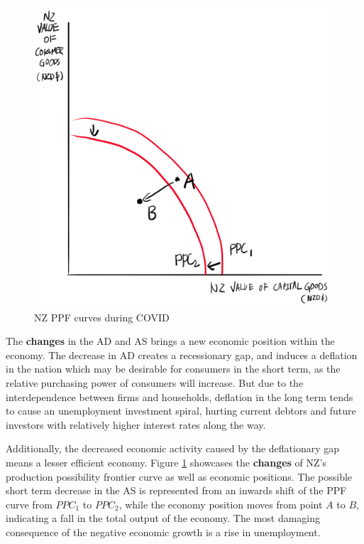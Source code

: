 \documentclass[a4paper,12pt]{article}
\begin{document}
\begin{figure}[H]
    \centering
    \includegraphics[scale=0.6]{assets/ppf.png}
    \caption{NZ PPF curves during COVID}
    \label{fig:ppf}
\end{figure}

The \textbf{changes} in the AD and AS brings a new economic position within the economy. The decrease in AD creates a recessionary gap, and induces a deflation in the nation which may be desirable for consumers in the short term, as the relative purchasing power of consumers will increase. But due to the interdependence between firms and households, deflation in the long term tends to cause an unemployment investment spiral,
hurting current debtors and future investors with relatively higher interest rates along the way.

Additionally, the decreased economic activity caused by the deflationary gap means a lesser efficient economy. Figure \ref{fig:ppf} showcases the \textbf{changes} of NZ's production possibility frontier curve as well as economic positions. The possible short term decrease in the AS is represented from an inwards shift of the PPF curve from $PPC_1$ to $PPC_2$, while the economy position moves from point $A$ to $B$, indicating a fall in the total output of the economy. The most damaging consequence of the negative economic growth is a rise in unemployment.
\end{document}
